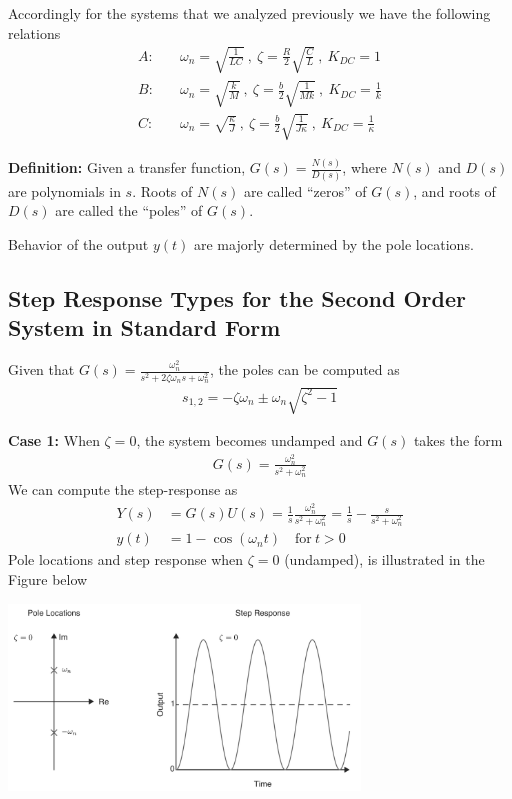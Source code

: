 \documentclass[twoside]{article}
\begin{document}
\vspace{12pt}

Accordingly for the systems that we analyzed previously we have the
following relations
%
\begin{align*}
A:& \quad  \omega_n = \sqrt{\frac{1}{LC}} \ , \ \zeta = \frac{R}{2}
  \sqrt{ \frac{C}{L} } \ , \ K_{DC} = 1
\\
B:& \quad  \omega_n = \sqrt{\frac{k}{M}} \ , \ \zeta = \frac{b}{2}
  \sqrt{ \frac{1}{M k} } \ , \ K_{DC} = \frac{1}{k}
\\
C:& \quad  \omega_n = \sqrt{\frac{\kappa}{J}} \ , \ \zeta = \frac{b}{2}
  \sqrt{ \frac{1}{J \kappa} } \ , \ K_{DC} = \frac{1}{\kappa}
\end{align*}

\textbf{Definition:} Given a transfer function, $G(s) =
\frac{N(s)}{D(s)}$, where $N(s)$ and $D(s)$ are polynomials in $s$.
Roots of $N(s)$ are called ``zeros'' of $G(s)$, and roots of $D(s)$
are called the ``poles'' of $G(s)$. 

Behavior of the output $y(t)$ are majorly determined by the pole
locations. 

\subsection{Step Response Types for the Second Order System in Standard
  Form}

Given that $G(s) = \frac{\omega_n^2}{s^2 + 2 \zeta \omega_n s +
  \omega_n^2}$, the poles can be computed as
%
\begin{align*}
  s_{1,2} = - \zeta \omega_n \pm \omega_n \sqrt{\zeta^2 - 1}
\end{align*}

\textbf{Case 1:} When $\zeta = 0$, the system becomes undamped and
$G(s)$ takes the form
%
\begin{align*}
  G(s) = \frac{\omega_n^2}{s^2 + \omega_n^2}
\end{align*}
%
We can compute the step-response as
%
\begin{align*}
 Y(s) &= G(s) U(s) = \frac{1}{s} \frac{\omega_n^2}{s^2 + \omega_n^2} =
        \frac{1}{s} - \frac{s}{s^2 + \omega_n^2}
\\
y(t) &= 1 - \cos(\omega_n t) \quad \mathrm{for} \ t > 0 
\end{align*}
%
Pole locations and step response when $\zeta = 0$ (undamped), is illustrated in
the Figure below

    \begin{minipage}[h]{1\linewidth}
    \begin{center}
     \includegraphics[width=0.7\textwidth]{undamped}
    \end{center}
  \end{minipage}
\end{document}
